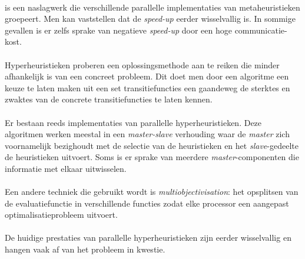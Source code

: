\paragraph{}
\cite{Alba2005book} is een naslagwerk die verschillende parallelle implementaties van metaheuristieken groepeert. Men kan vaststellen dat de \emph{speed-up} eerder wisselvallig is. In sommige gevallen is er zelfs sprake van negatieve \emph{speed-up} door een hoge communicatie-kost.

\paragraph{}
Hyperheuristieken proberen een oplossingsmethode aan te reiken die minder afhankelijk is van een concreet probleem. Dit doet men door een algoritme een keuze te laten maken uit een set transitiefuncties een gaandeweg de sterktes en zwaktes van de concrete transitiefuncties te laten kennen.

\paragraph{}
Er bestaan reeds implementaties van parallelle hyperheuristieken. Deze algoritmen werken meestal in een \emph{master-slave} verhouding waar de \emph{master} zich voornamelijk bezighoudt met de selectie van de heuristieken en het \emph{slave}-gedeelte de heuristieken uitvoert. Soms is er sprake van meerdere \emph{master}-componenten die informatie met elkaar uitwisselen.

\paragraph{}
Een andere techniek die gebruikt wordt is \emph{multiobjectivisation}: het opsplitsen van de evaluatiefunctie in verschillende functies zodat elke processor een aangepast optimalisatieprobleem uitvoert.

\paragraph{}
De huidige prestaties van parallelle hyperheuristieken zijn eerder wisselvallig en hangen vaak af van het probleem in kwestie.


